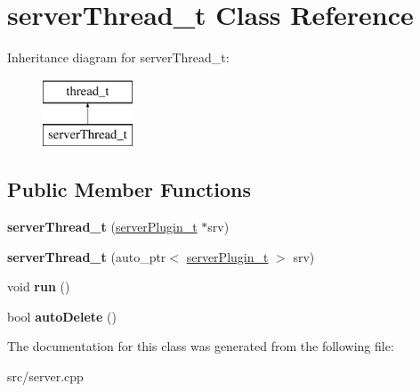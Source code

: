 \hypertarget{classserverThread__t}{\section{server\-Thread\-\_\-t \-Class \-Reference}
\label{classserverThread__t}
}
\-Inheritance diagram for server\-Thread\-\_\-t\-:\begin{figure}[H]
\begin{center}
\leavevmode
\includegraphics[height=2.000000cm]{classserverThread__t}
\end{center}
\end{figure}
\subsection*{\-Public \-Member \-Functions}
\begin{DoxyCompactItemize}
\item 
\hypertarget{classserverThread__t_ac847d44fa098f21dd1fe2bb909878dd5}{{\bfseries server\-Thread\-\_\-t} (\hyperlink{classserverPlugin__t}{server\-Plugin\-\_\-t} $\ast$srv)}\label{classserverThread__t_ac847d44fa098f21dd1fe2bb909878dd5}

\item 
\hypertarget{classserverThread__t_a5c655e46f238b3cb5bee97d60fb75ace}{{\bfseries server\-Thread\-\_\-t} (auto\-\_\-ptr$<$ \hyperlink{classserverPlugin__t}{server\-Plugin\-\_\-t} $>$ srv)}\label{classserverThread__t_a5c655e46f238b3cb5bee97d60fb75ace}

\item 
\hypertarget{classserverThread__t_a96573d0f8f03adca58a258b84eb743f0}{void {\bfseries run} ()}\label{classserverThread__t_a96573d0f8f03adca58a258b84eb743f0}

\item 
\hypertarget{classserverThread__t_a3ae7166292d6f00a40921cc485bd0f4a}{bool {\bfseries auto\-Delete} ()}\label{classserverThread__t_a3ae7166292d6f00a40921cc485bd0f4a}

\end{DoxyCompactItemize}


\-The documentation for this class was generated from the following file\-:\begin{DoxyCompactItemize}
\item 
src/server.\-cpp\end{DoxyCompactItemize}
